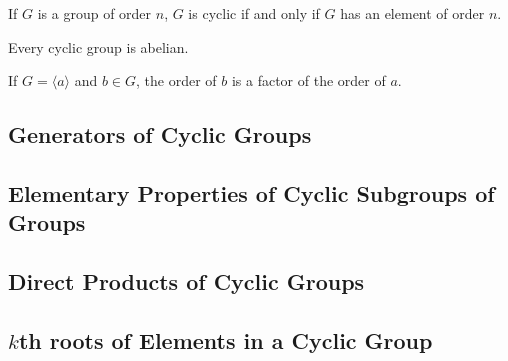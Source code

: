 \documentclass[11pt]{article}
\begin{document}
If $G$ is a group of order $n$, $G$ is cyclic if and only if $G$ has an element of order $n$.

Every cyclic group is abelian.

If $G = \langle a\rangle$ and $b \in G$, the order of $b$ is a factor of the order of $a$.

\subsection{Generators of Cyclic Groups}

\subsection{Elementary Properties of Cyclic Subgroups of Groups}

\subsection{Direct Products of Cyclic Groups}

\subsection{$k$th roots of Elements in a Cyclic Group}
\end{document}
